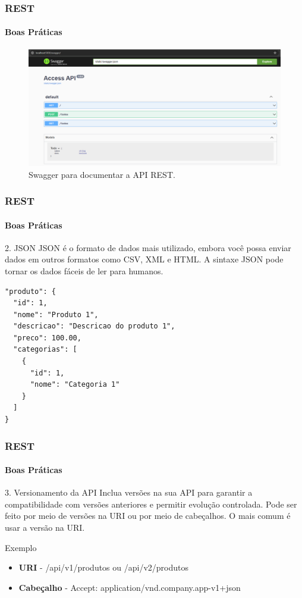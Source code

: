 \documentclass[
	9pt, %
	t, %
]{beamer}
\newcommand{\yellowbox}[1]{\colorbox{yellow!75}{#1}}
\begin{document}
\begin{frame}
	\frametitle{REST}
	\framesubtitle{Boas Práticas}

	\begin{figure}[h!]
		\includegraphics[width=1.0\linewidth]{swagger.png}
		\caption{Swagger para documentar a API REST.}
		\label{fig:swagger}
	\end{figure}

\end{frame}

\begin{frame}[fragile]
	\frametitle{REST}
	\framesubtitle{Boas Práticas}

	\begin{block}{2. JSON}
		JSON é o formato de dados mais utilizado, embora você possa enviar dados em outros formatos como CSV, XML e HTML. A sintaxe JSON pode tornar os dados fáceis de ler para humanos.

		\begin{lstlisting}[basicstyle=\small]
"produto": {
  "id": 1,
  "nome": "Produto 1",
  "descricao": "Descricao do produto 1",
  "preco": 100.00,
  "categorias": [
	{
	  "id": 1,
	  "nome": "Categoria 1"
	}
  ]
}

\end{lstlisting}
	\end{block}
\end{frame}

\begin{frame}
	\frametitle{REST}
	\framesubtitle{Boas Práticas}

	\begin{block}{3. Versionamento da API}
		Inclua versões na sua API para garantir a compatibilidade com versões anteriores e permitir evolução controlada.
		Pode ser feito por meio de versões na URI ou por meio de cabeçalhos. O mais comum é usar a versão na URI.
	\end{block}

	\begin{exampleblock}{Exemplo}
		\begin{itemize}
			\item \textbf{URI} - \yellowbox{/api/v1/produtos} ou \yellowbox{/api/v2/produtos}
			\item \textbf{Cabeçalho} - \yellowbox{Accept: application/vnd.company.app-v1+json}
		\end{itemize}
	\end{exampleblock}

\end{frame}
\end{document}
